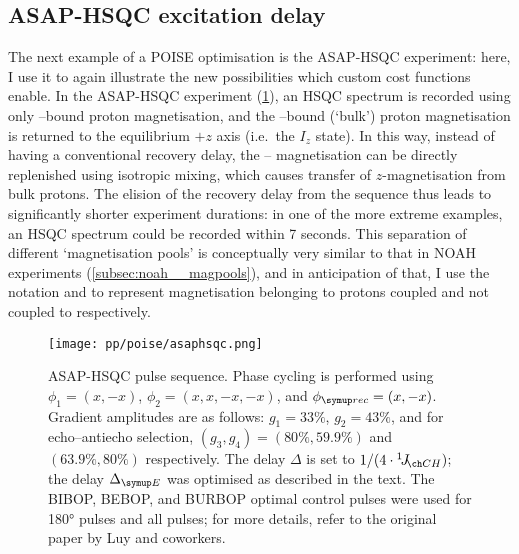 \subsection{ASAP-HSQC excitation delay}
\label{subsec:poise__asaphsqc}

The next example of a POISE optimisation is the ASAP-HSQC experiment\autocite{SchulzeSunninghausen2014JACS,SchulzeSunninghausen2017JMR}: here, I use it to again illustrate the new possibilities which custom cost functions enable.
In the ASAP-HSQC experiment (\cref{fig:asaphsqc_pulseq}), an HSQC spectrum is recorded using only \carbon{}--bound proton magnetisation, and the \carbont{}--bound (`bulk') proton magnetisation is returned to the equilibrium $+z$ axis (i.e.\ the $I_z$ state).
In this way, instead of having a conventional recovery delay, the \carbon{}--\proton{} magnetisation can be directly replenished using isotropic mixing, which causes transfer of $z$-magnetisation from bulk protons.
The elision of the recovery delay from the sequence thus leads to significantly shorter experiment durations: in one of the more extreme examples, an HSQC spectrum could be recorded within 7 seconds.
This separation of different `magnetisation pools' is conceptually very similar to that in NOAH experiments (\cref{subsec:noah__magpools}), and in anticipation of that, I use the notation  and  to represent magnetisation belonging to protons coupled and not coupled to \carbon{} respectively.

\begin{figure}[htb]
    \centering
    \texttt{[image: pp/poise/asaphsqc.png]}%
    \caption[ASAP-HSQC pulse sequence]{
        ASAP-HSQC pulse sequence.
        Phase cycling is performed using $\phi_1 = (x, -x)$, $\phi_2 = (x, x, -x, -x)$, and $\phirec = (x, -x)$.
        Gradient amplitudes are as follows: $g_1 = 33\%$, $g_2 = 43\%$, and for echo--antiecho selection, $(g_3, g_4) = (80\%, 59.9\%)$ and $(63.9\%, 80\%)$ respectively.
        The delay $\Delta$ is set to $1/(4 \cdot \oneJ{CH})$; the delay $\DeltaE$ was optimised as described in the text.
        The BIBOP, BEBOP, and BURBOP optimal control pulses\autocite{Kobzar2004JMR,Kobzar2008JMR,Kobzar2012JMR} were used for \proton{} \ang{180} pulses and all \carbon{} pulses; for more details, refer to the original paper by Luy and coworkers\autocite{SchulzeSunninghausen2014JACS}.
    }
    \label{fig:asaphsqc_pulseq}
\end{figure}


